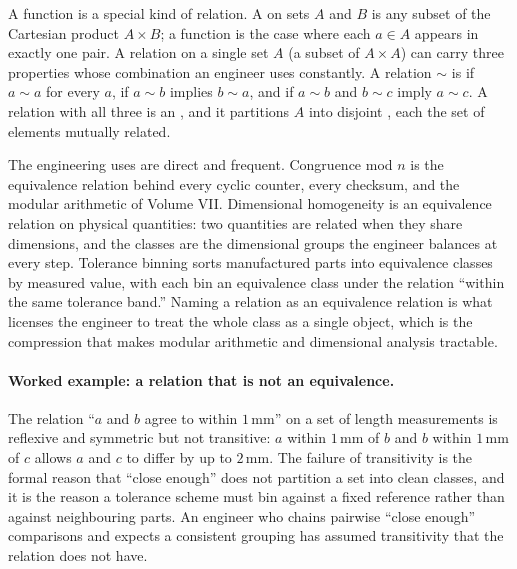 A function is a special kind of relation. A  on sets
$A$ and $B$ is any subset of the Cartesian product $A \times B$; a
function is the case where each $a \in A$ appears in exactly one pair.
A relation on a single set $A$ (a subset of $A \times A$) can carry
three properties whose combination an engineer uses constantly. A
relation $\sim$ is  if $a \sim a$ for every $a$,
 if $a \sim b$ implies $b \sim a$, and
 if $a \sim b$ and $b \sim c$ imply $a \sim c$. A
relation with all three is an , and it
partitions $A$ into disjoint , each the
set of elements mutually related.

The engineering uses are direct and frequent. Congruence mod $n$ is
the equivalence relation behind every cyclic counter, every checksum,
and the modular arithmetic of Volume VII. Dimensional homogeneity is
an equivalence relation on physical quantities: two quantities are
related when they share dimensions, and the classes are the
dimensional groups the engineer balances at every step. Tolerance
binning sorts manufactured parts into equivalence classes by measured
value, with each bin an equivalence class under the relation ``within
the same tolerance band.'' Naming a relation as an equivalence
relation is what licenses the engineer to treat the whole class as a
single object, which is the compression that makes modular arithmetic
and dimensional analysis tractable.

\paragraph{Worked example: a relation that is not an equivalence.}
The relation ``$a$ and $b$ agree to within $1\,\si{\milli\meter}$'' on
a set of length measurements is reflexive and symmetric but not
transitive: $a$ within $1\,\si{\milli\meter}$ of $b$ and $b$ within
$1\,\si{\milli\meter}$ of $c$ allows $a$ and $c$ to differ by up to
$2\,\si{\milli\meter}$. The failure of transitivity is the formal
reason that ``close enough'' does not partition a set into clean
classes, and it is the reason a tolerance scheme must bin against a
fixed reference rather than against neighbouring parts. An engineer who
chains pairwise ``close enough'' comparisons and expects a consistent
grouping has assumed transitivity that the relation does not have.

